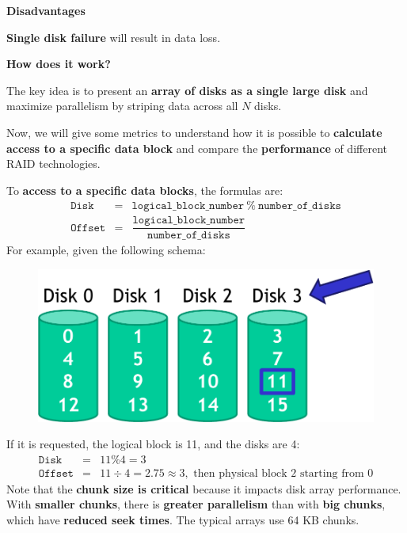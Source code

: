 \highspace
\begin{flushleft}
    \textcolor{Red2}{ \textbf{Disadvantages}}
\end{flushleft}
\textbf{Single disk failure} will result in data loss.

\highspace
\begin{flushleft}
    \textcolor{Green3}{ \textbf{How does it work?}}
\end{flushleft}
The key idea is to present an \textbf{array of disks as a single large disk} and maximize parallelism by striping data across all $N$ disks.

\highspace
Now, we will give some metrics to understand how it is possible to \textbf{calculate access to a specific data block} and compare the \textbf{performance} of different RAID technologies.

\highspace
To \textbf{access to a specific data blocks}, the formulas are:
\begin{equation}
    \begin{array}{rcl}
        \texttt{Disk}    &=& \texttt{logical\_block\_number} \: \% \: \texttt{number\_of\_disks} \\ [.5em]
        \texttt{Offset}  &=& \dfrac{\texttt{logical\_block\_number}}{\texttt{number\_of\_disks}}
    \end{array}
\end{equation}
For example, given the following schema:
\begin{figure}[!htp]
    \centering
    \includegraphics[width=.5\textwidth]{img/raid-1.pdf}
\end{figure}

\noindent
If it is requested, the logical block is 11, and the disks are 4:
\begin{equation*}
    \begin{array}{rcl}
        \texttt{Disk}    &=& 11 \% 4 = 3 \\ [.5em]
        \texttt{Offset}  &=& 11 \div 4 = 2.75 \approx 3, \text{ then physical block 2 starting from 0}
    \end{array}
\end{equation*}
Note that the \textbf{chunk size is critical} because it impacts disk array performance. With \textbf{smaller chunks}, there is \textbf{greater parallelism} than with \textbf{big chunks}, which have \textbf{reduced seek times}. The typical arrays use 64 KB chunks.

